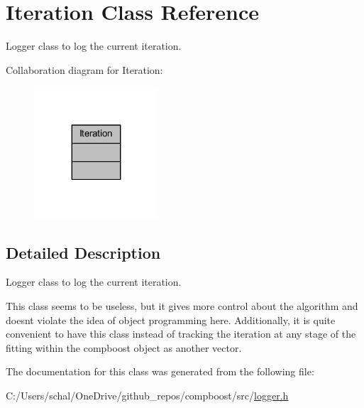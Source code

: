 \hypertarget{class_iteration}{}\section{Iteration Class Reference}
\label{class_iteration}


Logger class to log the current iteration.  




Collaboration diagram for Iteration\+:\nopagebreak
\begin{figure}[H]
\begin{center}
\leavevmode
\includegraphics[width=131pt]{class_iteration__coll__graph}
\end{center}
\end{figure}


\subsection{Detailed Description}
Logger class to log the current iteration. 

This class seems to be useless, but it gives more control about the algorithm and doesn\textquotesingle{}t violate the idea of object programming here. Additionally, it is quite convenient to have this class instead of tracking the iteration at any stage of the fitting within the compboost object as another vector. 

The documentation for this class was generated from the following file\+:\begin{DoxyCompactItemize}
\item 
C\+:/\+Users/schal/\+One\+Drive/github\+\_\+repos/compboost/src/\mbox{\hyperlink{logger_8h}{logger.\+h}}\end{DoxyCompactItemize}
